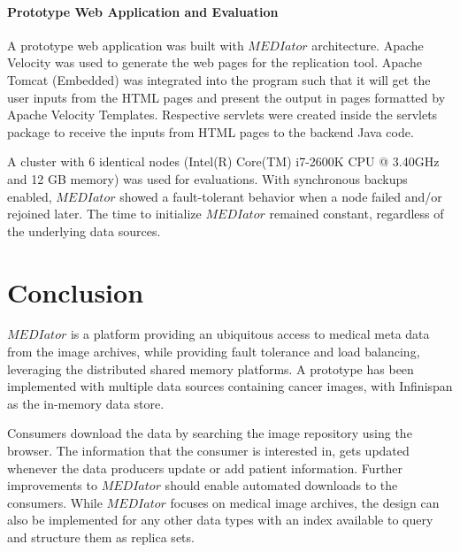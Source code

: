 \documentclass[conference]{IEEEtran}
\begin{document}
\paragraph*{\textbf{Prototype Web Application and Evaluation}}
A prototype web application was built with $MEDIator$ architecture. Apache Velocity was used to generate the web pages for the replication tool. Apache Tomcat (Embedded) was integrated into the program such that it will get the user inputs from the HTML pages and present the output in pages formatted by Apache Velocity Templates. Respective servlets were created inside the servlets package to receive the inputs from HTML pages to the backend Java code.

A cluster with 6 identical nodes (Intel(R) Core(TM) i7-2600K CPU @ 3.40GHz and 12 GB memory) was used for evaluations. With synchronous backups enabled, $MEDIator$ showed a fault-tolerant behavior when a node failed and/or rejoined later. The time to initialize $MEDIator$ remained constant, regardless of the underlying data sources.


\section{Conclusion}
\balance

$MEDIator$ is a platform providing an ubiquitous access to medical meta data from the image archives, while providing fault tolerance and load balancing, leveraging the distributed shared memory platforms. A prototype has been implemented with multiple data sources containing cancer images, with Infinispan as the in-memory data store.

Consumers download the data by searching the image repository using the browser. The information that the consumer is interested in, gets updated whenever the data producers update or add patient information. Further improvements to $MEDIator$ should enable automated downloads to the consumers. While $MEDIator$ focuses on medical image archives, the design can also be implemented for any other data types with an index available to query and structure them as replica sets.


\end{document}
